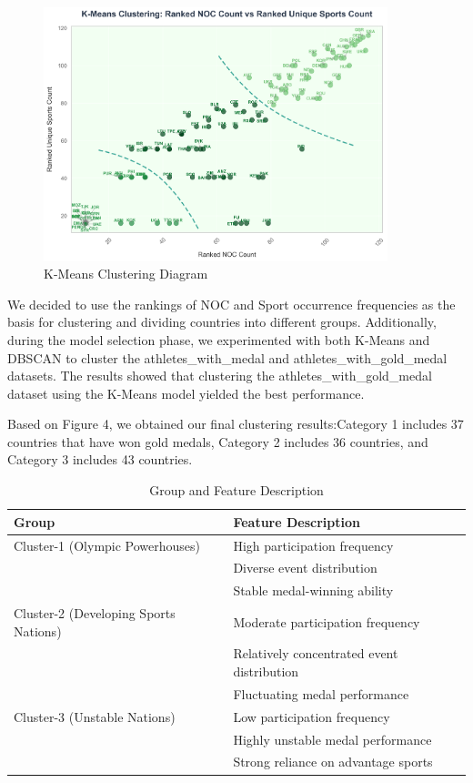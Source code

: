 \documentclass{mcmthesis}
\begin{document}
\begin{figure}[H]
    \centering
    \includegraphics[width=10cm]{graph/K-Means Clustering Redraw.png}
    \caption{K-Means Clustering Diagram} \label{Figure 4}
\end{figure}

We decided to use the rankings of NOC and Sport occurrence frequencies as the basis for clustering and dividing countries into different groups. Additionally, during the model selection phase, we experimented with both K-Means and DBSCAN to cluster the athletes\_with\_medal and athletes\_with\_gold\_medal datasets. The results showed that clustering the athletes\_with\_gold\_medal dataset using the K-Means model yielded the best performance.

Based on Figure 4, we obtained our final clustering results:Category 1 includes 37 countries that have won gold medals, Category 2 includes 36 countries, and Category 3 includes 43 countries.


\begin{table}[htbp]
    \centering
    \caption{Group and Feature Description}
    \begin{tabular}{@{}p{5cm}p{10cm}@{}}
        \toprule[2pt]
        \textbf{Group} & \textbf{Feature Description} \\
        \midrule[1pt]
        Cluster-1 (Olympic Powerhouses) & 
        High participation frequency \\
        & Diverse event distribution \\
        & Stable medal-winning ability \\
        \addlinespace
        Cluster-2 (Developing Sports Nations) & 
        Moderate participation frequency \\
        & Relatively concentrated event distribution \\
        & Fluctuating medal performance \\
        \addlinespace
        Cluster-3 (Unstable Nations) & 
        Low participation frequency \\
        & Highly unstable medal performance \\
        & Strong reliance on advantage sports \\
        \bottomrule[2pt]
    \end{tabular}
\end{table}
\end{document}
